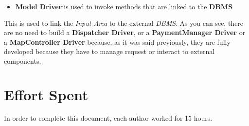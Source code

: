 \documentclass[11pt,a4paper]{report}
\begin{document}
\begin{itemize}
	\item \textbf{Model Driver}:is used to invoke methods that are linked to the \textbf{DBMS}
\end{itemize}
This is used to link the \textit{Input Area} to the external \textit{DBMS}.
As you can see, there are no need to build a \textbf{Dispatcher Driver}, or a \textbf{PaymentManager Driver} or a \textbf{MapController Driver} because, as it was said previously, they are fully developed because they have to manage request or interact to external components.
\chapter{Effort Spent}
In order to complete this document, each author worked for 15 hours.
\end{document}
